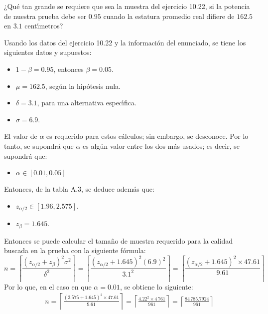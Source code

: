 \begin{enunciado}
 ¿Qu\'e tan grande se requiere que sea la muestra del ejercicio 10.22, si la potencia de nuestra prueba debe ser $0.95$ cuando la estatura promedio real difiere de $162.5$ en $3.1$ cent\'{\i}metros?
\end{enunciado}

\begin{solucion}
 Usando los datos del ejercicio 10.22 y la informaci\'on del enunciado, se tiene los siguientes datos y supuestos:
 \begin{itemize}
  \item $1 - \beta = 0.95$, entonces $\beta = 0.05$.
  \item $\mu = 162.5$, seg\'un la hip\'otesis nula.
  \item $\delta = 3.1$, para una alternativa espec\'{\i}fica.
  \item $\sigma = 6.9$.
 \end{itemize}
 El valor de $\alpha$ es requerido para estos c\'alculos; sin embargo, se desconoce. Por lo tanto, se supondr\'a que $\alpha$ es alg\'un valor entre los dos m\'as usados; es decir, se supondr\'a que:
 \begin{itemize}
  \item $\alpha \in [ 0.01, 0.05 ]$
 \end{itemize}
 Entonces, de la tabla A.3, se deduce adem\'as que:
 \begin{itemize}
  \item $z_{\alpha/2} \in [1.96, 2.575]$.
  \item $z_{\beta} = 1.645$.
 \end{itemize}
 Entonces se puede calcular el tama\~no de muestra requerido para la calidad buscada en la prueba con la siguiente f\'ormula:
 \begin{equation*}
  n =
  \left\lceil
  \frac{\left( z_{\alpha/2} + z_{\beta} \right)^2 \sigma^2}{\delta^2}
  \right\rceil
  = \left\lceil
  \frac{\left( z_{\alpha/2} + 1.645 \right)^2 (6.9)^2}{3.1^2}
  \right\rceil
  = \left\lceil
  \frac{\left( z_{\alpha/2} + 1.645 \right)^2 \times 47.61}{9.61}
  \right\rceil
 \end{equation*}
 Por lo que, en el caso en que $\alpha = 0.01$, se obtiene lo siguiente:
 \begin{eqnarray*}
  n =
  \left\lceil \frac{\left( 2.575 + 1.645 \right)^2 \times 47.61}{9.61} \right\rceil
  = \left\lceil
  \frac{4.22^2\times 4\,761}{961}
  \right\rceil
  = \left\lceil \frac{84\,785.7924}{961} \right\rceil

\end{eqnarray*}
\end{solucion}
